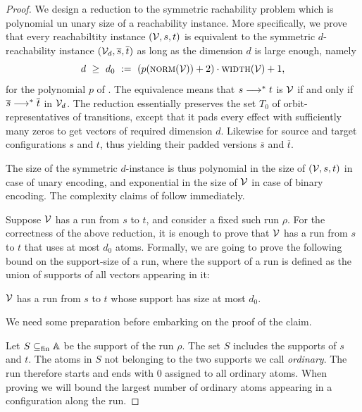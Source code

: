 \documentclass[a4paper,UKenglish,cleveref, autoref, thm-restate,dvipsnames,anonymous]{lipics-v2021}
\begin{document}
\begin{proof}
We design a reduction to the symmetric \vass rachability problem which is polynomial
un unary size of a \donevass reachability instance.
More specifically, we prove that 
every \donevass reachabiltity instance $(\mathcal{V}, s, t)$ is equivalent to
the symmetric $d$-\vass reachability instance $({\mathcal{V}}_{d}, \overline s, \overline t)$ 
as long as 
the dimension $d$ is large enough, namely 
\[
d\ \geq \ d_0 \ := \ (p(\textsc{norm}(\mathcal{V})) + 2)\cdot\textsc{width}(\mathcal{V}) + 1,
\]
for  the polynomial $p$ of .
% 
The equivalence means that $s \longrightarrow^* t$ is $\mathcal{V}$ if and only if
$\overline s \longrightarrow^* \overline t$ in ${\mathcal{V}}_{d}$.
The reduction essentially preserves the set $T_0$ of orbit-representatives of 
transitions, except that it pads every effect with sufficiently many zeros to get
vectors of required dimension $d$.
Likewise for source and target configurations $s$ and $t$, thus yielding their padded
versions $\overline s$ and $\overline t$.

The size of the symmetric $d$-\vass instance is thus polynomial in the size of 
$(\mathcal{V},s,t)$ in case of
unary encoding, and exponential in the size of $\mathcal{V}$ in case of binary encoding.
The complexity claims of  follow immediately.

\medskip

Suppose $\mathcal{V}$ has a run from $s$ to $t$, and consider a fixed such run $\rho$.
For the correctness of the above reduction, it is enough to prove that
$\mathcal{V}$ has a run from $s$ to $t$ that uses at most $d_0$ atoms.
Formally, we are going to prove the following 
bound on the support-size of a run, where the support of a run is defined
as the union of supports of all vectors appearing in it:
\begin{claim} \label{claim:sup-bound}
$\mathcal{V}$ has a run from $s$ to $t$ whose support has size at most $d_0$.
\end{claim}

We need some preparation before embarking on the proof of the claim.

Let $S\subseteq_{\text{fin}} \mathbb{A}$ be the support of the run $\rho$.
The set $S$ includes the supports of $s$ and $t$. The atoms in $S$ not belonging to
the two supports we call \emph{ordinary}. 
The run therefore starts and ends with 0 assigned to all ordinary atoms. 
When proving  we will bound the largest number of
ordinary atoms appearing in a configuration along the run.


\end{proof}
\end{document}
